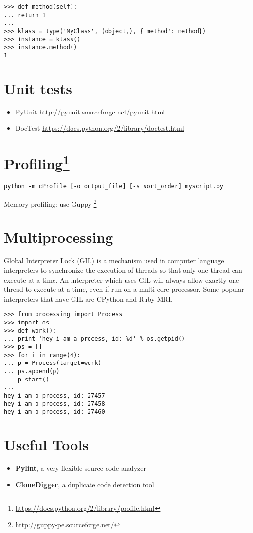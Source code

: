 \documentclass[fleqn,10pt]{SelfArx} %
\begin{document}
	\begin{lstlisting}
>>> def method(self):
... return 1
...
>>> klass = type('MyClass', (object,), {'method': method})
>>> instance = klass()
>>> instance.method()
1
	\end{lstlisting}
		

	\section{Unit tests}
	
	\begin{itemize}
		\item PyUnit \url{http://pyunit.sourceforge.net/pyunit.html}
		\item DocTest \url{https://docs.python.org/2/library/doctest.html}
	\end{itemize}

	
	\section[Profiling]{Profiling\footnote{\url{https://docs.python.org/2/library/profile.html}}}
	
	\begin{lstlisting}
python -m cProfile [-o output_file] [-s sort_order] myscript.py
	\end{lstlisting}
	
	Memory profiling: use Guppy \footnote{\url{http://guppy-pe.sourceforge.net/}}
	
	
	\section{Multiprocessing}
	
	Global Interpreter Lock (GIL) is a mechanism used in computer language interpreters to synchronize the execution of threads so that only one thread can execute at a time. An interpreter which uses GIL will always allow exactly one thread to execute at a time, even if run on a multi-core processor. Some popular interpreters that have GIL are CPython and Ruby MRI.
	
	\begin{lstlisting}
>>> from processing import Process
>>> import os
>>> def work():
... print 'hey i am a process, id: %d' % os.getpid()
>>> ps = []
>>> for i in range(4):
... p = Process(target=work)
... ps.append(p)
... p.start()
... 
hey i am a process, id: 27457
hey i am a process, id: 27458
hey i am a process, id: 27460
	\end{lstlisting}
	
	

	\section{Useful Tools}
	
	\begin{itemize}
		\item \textbf{Pylint}, a very flexible source code analyzer
		\item \textbf{CloneDigger}, a duplicate code detection tool
	\end{itemize}
	
\end{document}
